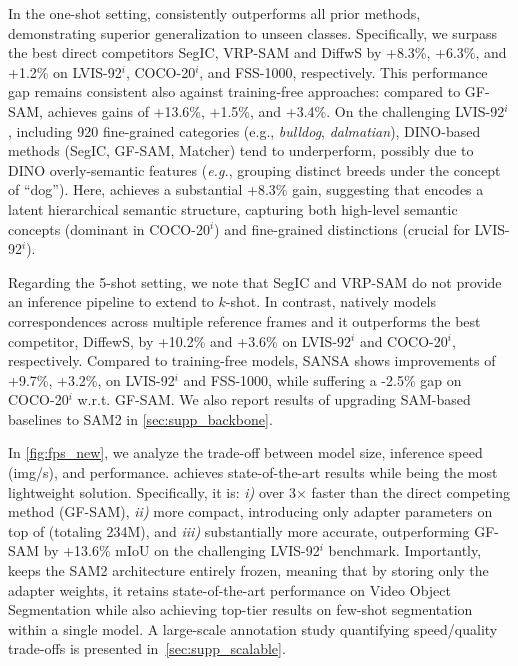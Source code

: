 In the one-shot setting, \ours{} consistently outperforms all prior methods, demonstrating superior generalization to unseen classes. Specifically, we surpass the best direct competitors SegIC, VRP-SAM and DiffwS by +8.3\%, +6.3\%, and +1.2\% on LVIS-92$^i$, COCO-20$^i$, and FSS-1000, respectively. This performance gap remains consistent also against training-free approaches: compared to GF-SAM, \ours{} achieves gains of +13.6\%, +1.5\%, and +3.4\%.
On the challenging LVIS-92$^i$, including 920 fine-grained categories (e.g., \textit{bulldog}, \textit{dalmatian}), DINO-based methods (SegIC, GF-SAM, Matcher) tend to underperform, possibly due to DINO overly-semantic features \cite{engstler2023understanding, zhang2023tale} (\textit{e.g.}, grouping distinct breeds  under the concept of “dog”). Here, \ours{} achieves a substantial +8.3\% gain, suggesting that \sam{} encodes a latent hierarchical semantic structure, capturing both high-level semantic concepts (dominant in COCO-20$^i$) and fine-grained distinctions (crucial for LVIS-92$^i$). 

Regarding the 5-shot setting, we note that SegIC and VRP-SAM do not provide an inference pipeline to extend to $k$-shot. In contrast, \ours{} natively models correspondences across multiple reference frames and it outperforms the best competitor, DiffewS, by +10.2\% and +3.6\% on LVIS-92$^i$ and COCO-20$^i$, respectively. Compared to training-free models, SANSA shows improvements of +9.7\%, +3.2\%, on LVIS-92$^i$ and FSS-1000, while suffering a -2.5\% gap on COCO-20$^i$ w.r.t. GF-SAM.
We also report results of upgrading SAM-based baselines to SAM2 in \cref{sec:supp_backbone}.



In \cref{fig:fps_new}, we analyze the trade-off between model size, inference speed (img/s), and performance. \ours{} achieves state-of-the-art results while being the most lightweight solution. Specifically, it is: \textit{i)} over 3× faster than the direct competing method (GF-SAM), \textit{ii)} more compact, introducing only adapter parameters on top of \sam{} (totaling 234M), and \textit{iii)} substantially more accurate, outperforming GF-SAM by +13.6\% mIoU on the challenging LVIS-92$^i$ benchmark.
Importantly, \ours{} keeps the SAM2 architecture entirely frozen, meaning that by storing only the adapter weights, it retains \sam{} state-of-the-art performance on Video Object Segmentation while also achieving top-tier results on few-shot segmentation within a single model. A large-scale annotation study quantifying speed/quality trade-offs is presented in~\cref{sec:supp_scalable}.



